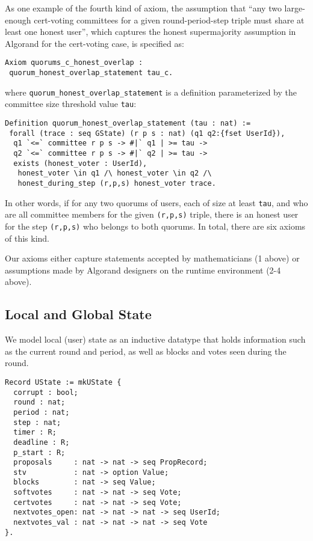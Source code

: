 As one example of the fourth kind of axiom, the assumption that ``any two large-enough cert-voting committees for a given round-period-step triple must share at least one honest user'', which captures the honest supermajority assumption in Algorand for the cert-voting case, is specified as:
\begin{lstlisting}[language=Coq]
Axiom quorums_c_honest_overlap :
 quorum_honest_overlap_statement tau_c.
\end{lstlisting}
where \lstinline{quorum_honest_overlap_statement} is a definition parameterized by the committee size threshold value \lstinline{tau}:
\begin{lstlisting}[language=Coq]
Definition quorum_honest_overlap_statement (tau : nat) :=
 forall (trace : seq GState) (r p s : nat) (q1 q2:{fset UserId}),
  q1 `<=` committee r p s -> #|` q1 | >= tau ->					
  q2 `<=` committee r p s -> #|` q2 | >= tau ->					
  exists (honest_voter : UserId),
   honest_voter \in q1 /\ honest_voter \in q2 /\
   honest_during_step (r,p,s) honest_voter trace.
\end{lstlisting}
In other words, if for any two quorums of users, each of size at least \lstinline{tau}, and who are all committee members for the given \lstinline{(r,p,s)} triple, there is an honest user for the step \lstinline{(r,p,s)} who belongs to both quorums. In total, there are six axioms of this kind.

Our axioms either capture statements accepted by mathematicians (1 above) or assumptions made by Algorand designers on the runtime environment (2-4 above).

\subsection{Local and Global State}

We model local (user) state as an inductive datatype that holds information such as the current round and period, as well as blocks and votes seen during the round.

\begin{lstlisting}[language=Coq]
Record UState := mkUState {
  corrupt : bool;
  round : nat;
  period : nat;
  step : nat;
  timer : R;
  deadline : R;
  p_start : R;
  proposals     : nat -> nat -> seq PropRecord;
  stv           : nat -> option Value;
  blocks        : nat -> seq Value;
  softvotes     : nat -> nat -> seq Vote;
  certvotes     : nat -> nat -> seq Vote;
  nextvotes_open: nat -> nat -> nat -> seq UserId;
  nextvotes_val : nat -> nat -> nat -> seq Vote
}.
\end{lstlisting}

